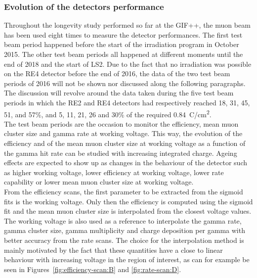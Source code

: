 \normalsize
	
	\subsubsection{Evolution of the detectors performance}
	\label{chapt5:sssec:perfevol}
	
	Throughout the longevity study performed so far at the GIF++, the muon beam has been used eight times to measure the detector performances. The first test beam period happened before the start of the irradiation program in October 2015. The other test beam periods all happened at different moments until the end of 2018 and the start of LS2. Due to the fact that no irradiation was possible on the RE4 detector before the end of 2016, the data of the two test beam periods of 2016 will not be shown nor discussed along the following paragraphs. The discussion will revolve around the data taken during the five test beam periods in which the RE2 and RE4 detectors had respectively reached 18, 31, 45, 51, and 57\%, and 5, 11, 21, 26 and 30\% of the required \SI{0.84}{C/cm^2}.\\
	The test beam periods are the occasion to monitor the efficiency, mean muon cluster size and gamma rate at working voltage. This way, the evolution of the efficiency and of the mean muon cluster size at working voltage as a function of the gamma hit rate can be studied with increasing integrated charge. Ageing effects are expected to show up as changes in the behaviour of the detector such as higher working voltage, lower efficiency at working voltage, lower rate capability or lower mean muon cluster size at working voltage.\\
	From the efficiency scans, the first parameter to be extracted from the sigmoid fits is the working voltage. Only then the efficiency is computed using the sigmoid fit and the mean muon cluster size is interpolated from the closest voltage values. The working voltage is also used as a reference to interpolate the gamma rate, gamma cluster size, gamma multiplicity and charge deposition per gamma with better accuracy from the rate scans. The choice for the interpolation method is mainly motivated by the fact that these quantities have a close to linear behaviour with increasing voltage in the region of interest, as can for example be seen in Figures~\ref{fig:efficiency-scan:B} and \ref{fig:rate-scan:D}.
	
